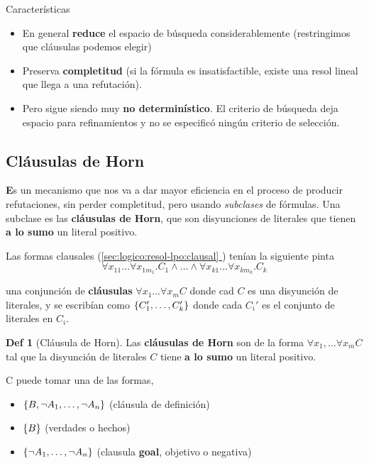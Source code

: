 \documentclass{report}
\newcommand*{\fullref}[1]{\hyperref[{#1}]{\autoref*{#1} \nameref*{#1}}}
\theoremstyle{definition} %
\newtheorem*{definition*}{Def}
\newenvironment{nota}[1]
    {\begin{leftbar}\textbf{#1}}
    {\end{leftbar}}
\begin{document}
Características

\begin{itemize}
    \item En general \textbf{reduce} el espacio de búsqueda considerablemente
    (restringimos que cláusulas podemos elegir)
    \item Preserva \textbf{completitud} (si la fórmula es insatisfactible,
    existe una resol lineal que llega a una refutación).
    \item Pero sigue siendo muy \textbf{no determinístico}. El criterio de
    búsqueda deja espacio para refinamientos y no se especificó ningún criterio
    de selección.
\end{itemize}

\subsection{Cláusulas de Horn}

\begin{nota}
Es un mecanismo que nos va a dar mayor eficiencia en el proceso de producir
refutaciones, sin perder completitud, pero usando \textit{subclases} de
fórmulas. Una subclase es las \textbf{cláusulas de Horn}, que son disyunciones
de literales que tienen \textbf{a lo sumo} un literal positivo.

Las formas clausales (\fullref{sec:logico:resol-lpo:clausal}) tenían la
siguiente pinta
\[
    \forall x_{11}\dots \forall x_{1m_1} .C_1 \wedge \dots \wedge
    \forall x_{k1}\dots \forall x_{km_k} .C_k
\]

una conjunción de \textbf{cláusulas} $\forall x_1 \dots \forall x_m C$ donde cad
$C$ es una disyunción de literales, y se escribían como $\{ C_1', \dots,
C_k' \}$ donde cada $C_i'$ es el conjunto de literales en $C_i$.
\end{nota}

\begin{definition*}[Cláusula de Horn]
    Las \textbf{cláusulas de Horn} son de la forma
    $\forall x_1, \dots \forall x_m C$ tal que la disyunción de literales $C$
    tiene \textbf{a lo sumo} un literal positivo.

    C puede tomar una de las formas,
    \begin{itemize}
        \item $\{ B, \neg A_1, \dots, \neg A_n \}$ (cláusula de definición)
        \item $\{ B \}$ (verdades o hechos)
        \item $\{ \neg A_1, \dots, \neg A_n \}$ (clausula \textbf{goal},
        objetivo o negativa)
    \end{itemize}
\end{definition*}
\end{document}
